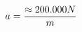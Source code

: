\documentclass[preview]{standalone}
\begin{document}
\begin{align*}
\special{dvisvgm:raw <g id='unique000'>}a = \frac{\approx 200.000 N}{m}\special{dvisvgm:raw </g>}
\end{align*}
\end{document}
